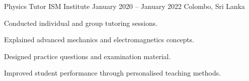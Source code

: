 
\Experience
{Physics Tutor}
{ISM Institute}
{January 2020 -- January 2022}
{Colombo, Sri Lanka}
{
\item Conducted individual and group tutoring sessions.

\item Explained advanced mechanics and electromagnetics concepts.

\item Designed practice questions and examination material.

\item Improved student performance through personalised teaching methods.
}